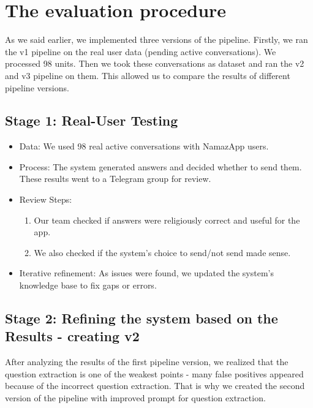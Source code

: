 \section{The evaluation procedure}
\label{sec:eval_procedure}

As we said earlier, we implemented three versions of the pipeline. Firstly, we ran the v1 pipeline on the real user data (pending active conversations). We processed 98 units. Then we took these conversations as dataset and ran the v2 and v3 pipeline on them. This allowed us to compare the results of different pipeline versions.

\subsection{Stage 1: Real-User Testing}

    \begin{itemize}
        \item Data: We used 98 real active conversations with NamazApp users.
        \item Process: The system generated answers and decided whether to send them. These results went to a Telegram group for review.
        \item Review Steps:
            \begin{enumerate}
                \item Our team checked if answers were religiously correct and useful for the app.
                \item We also checked if the system’s choice to send/not send made sense.
            \end{enumerate}
        \item Iterative refinement: As issues were found, we updated the system’s knowledge base to fix gaps or errors.
    \end{itemize}

\subsection{Stage 2: Refining the system based on the Results - creating v2}

After analyzing the results of the first pipeline version, we realized that the question extraction is one of the weakest points - many false positives appeared because of the incorrect question extraction. That is why we created the second version of the pipeline with improved prompt for question extraction.

